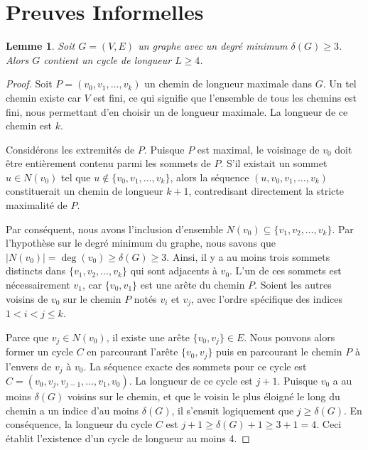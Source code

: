 \documentclass[11pt,a4paper]{article}
\newtheorem{lemma}[theorem]{Lemme}
\begin{document}
\section{Preuves Informelles}

\begin{lemma}
Soit $G = (V, E)$ un graphe avec un degr\'e minimum $\delta(G) \ge 3$. Alors $G$ contient un cycle de longueur $L \ge 4$.
\end{lemma}

\begin{proof}
Soit $P = (v_0, v_1, \dots, v_k)$ un chemin de longueur maximale dans $G$. Un tel chemin existe car $V$ est fini, ce qui signifie que l'ensemble de tous les chemins est fini, nous permettant d'en choisir un de longueur maximale. La longueur de ce chemin est $k$.

Consid\'erons les extremit\'es de $P$. Puisque $P$ est maximal, le voisinage de $v_0$ doit \^etre enti\`erement contenu parmi les sommets de $P$. S'il existait un sommet $u \in N(v_0)$ tel que $u \notin \{v_0, v_1, \dots, v_k\}$, alors la s\'equence $(u, v_0, v_1, \dots, v_k)$ constituerait un chemin de longueur $k+1$, contredisant directement la stricte maximalit\'e de $P$.

Par cons\'equent, nous avons l'inclusion d'ensemble $N(v_0) \subseteq \{v_1, v_2, \dots, v_k\}$.
Par l'hypoth\`ese sur le degr\'e minimum du graphe, nous savons que $|N(v_0)| = \deg(v_0) \ge \delta(G) \ge 3$.
Ainsi, il y a au moins trois sommets distincts dans $\{v_1, v_2, \dots, v_k\}$ qui sont adjacents \`a $v_0$.
L'un de ces sommets est n\'ecessairement $v_1$, car $\{v_0, v_1\}$ est une ar\^ete du chemin $P$.
Soient les autres voisins de $v_0$ sur le chemin $P$ not\'es $v_i$ et $v_j$, avec l'ordre sp\'ecifique des indices $1 < i < j \le k$.

Parce que $v_j \in N(v_0)$, il existe une ar\^ete $\{v_0, v_j\} \in E$.
Nous pouvons alors former un cycle $C$ en parcourant l'ar\^ete $\{v_0, v_j\}$ puis en parcourant le chemin $P$ \`a l'envers de $v_j$ \`a $v_0$.
La s\'equence exacte des sommets pour ce cycle est $C = (v_0, v_j, v_{j-1}, \dots, v_1, v_0)$.
La longueur de ce cycle est $j + 1$.
Puisque $v_0$ a au moins $\delta(G)$ voisins sur le chemin, et que le voisin le plus \'eloign\'e le long du chemin a un indice d'au moins $\delta(G)$, il s'ensuit logiquement que $j \ge \delta(G)$.
En cons\'equence, la longueur du cycle $C$ est $j + 1 \ge \delta(G) + 1 \ge 3 + 1 = 4$.
Ceci \'etablit l'existence d'un cycle de longueur au moins 4.
\end{proof}
\end{document}
